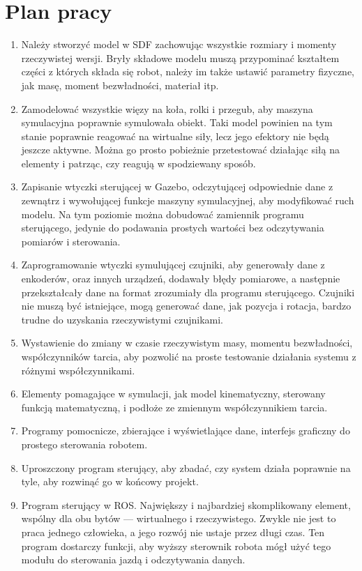 \section{Plan pracy}
	\begin{enumerate}
	\item Należy stworzyć model w SDF zachowując wszystkie rozmiary i momenty rzeczywistej wersji.
	Bryły składowe modelu muszą przypominać kształtem części z których składa się robot, należy im także ustawić parametry fizyczne, jak masę, moment bezwładności, materiał itp.
	\item Zamodelować wszystkie więzy na koła, rolki i przegub, aby maszyna symulacyjna poprawnie symulowała obiekt.
	Taki model powinien na tym stanie poprawnie reagować na wirtualne siły, lecz jego efektory nie będą jeszcze aktywne.
	Można go prosto pobieżnie przetestować działając siłą na elementy i patrząc, czy reagują w spodziewany sposób.
	\item Zapisanie wtyczki sterującej w Gazebo, odczytującej odpowiednie dane z zewnątrz i wywołującej funkcje maszyny symulacyjnej, aby modyfikować ruch modelu.
	Na tym poziomie można dobudować zamiennik programu sterującego, jedynie do podawania prostych wartości bez odczytywania pomiarów i sterowania.
	\item Zaprogramowanie wtyczki symulującej czujniki, aby generowały dane z enkoderów, oraz innych urządzeń, dodawały błędy pomiarowe, a następnie przekształcały dane na format zrozumiały dla programu sterującego.
	Czujniki nie muszą być istniejące, mogą generować dane, jak pozycja i rotacja, bardzo trudne do uzyskania rzeczywistymi czujnikami.
	\item Wystawienie do zmiany w czasie rzeczywistym masy, momentu bezwładności, współczynników tarcia, aby pozwolić na proste testowanie działania systemu z różnymi współczynnikami.
	\item Elementy pomagające w symulacji, jak model kinematyczny, sterowany funkcją matematyczną, i podłoże ze zmiennym współczynnikiem tarcia.
	\item Programy pomocnicze, zbierające i wyświetlające dane, interfejs graficzny do prostego sterowania robotem.
	\item Uproszczony program sterujący, aby zbadać, czy system działa poprawnie na tyle, aby rozwinąć go w końcowy projekt.
	\item Program sterujący w ROS. Największy i najbardziej skomplikowany element, wspólny dla obu bytów --- wirtualnego i rzeczywistego.
	Zwykle nie jest to praca jednego człowieka, a jego rozwój nie ustaje przez długi czas.
	Ten program dostarczy funkcji, aby wyższy sterownik robota mógł użyć tego modułu do sterowania jazdą i odczytywania danych.
	\end{enumerate}


